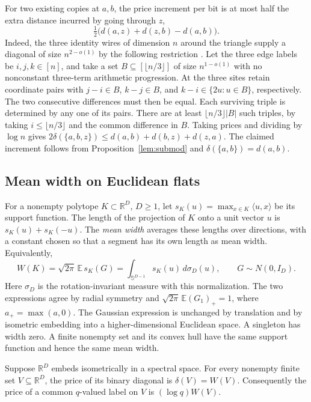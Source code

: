 For two existing copies at $a,b$, the price increment per bit is at
most half the extra distance incurred by going through $z$,
\[
 \tfrac12\bigl(d(a,z)+d(z,b)-d(a,b)\bigr).
\]
Indeed, the three identity wires of dimension $n$ around the triangle
supply a diagonal of size $n^{2-o(1)}$ by the following restriction
\cite{Strassen87,Behrend,cvzgraph}. Let the three edge labels be
$i,j,k\in[n]$, and take a set $B\subseteq[\lfloor n/3\rfloor]$ of
size $n^{1-o(1)}$ with no nonconstant three-term arithmetic progression.
At the three sites retain coordinate pairs with
$j-i\in B$, $k-j\in B$, and $k-i\in \{2u:u\in B\}$, respectively.
The two consecutive differences must then be equal.
Each surviving triple is determined by any one of its pairs. There are
at least $\lfloor n/3\rfloor |B|$ such triples, by taking
$i\le\lfloor n/3\rfloor$ and the common difference in $B$. Taking
prices and dividing by $\log n$ gives
$2\delta(\{a,b,z\})\le d(a,b)+d(b,z)+d(z,a)$. The claimed increment
follows from Proposition~\ref{lem:submod} and $\delta(\{a,b\})=d(a,b)$.

\subsection{Mean width on Euclidean flats}

For a nonempty polytope $K\subset\mathbb R^D$, $D\ge1$, let
$s_K(u)=\max_{x\in K}\langle u,x\rangle$ be its support function.
The length of the projection of $K$ onto a unit vector $u$ is
$s_K(u)+s_K(-u)$. The \emph{mean width} averages these lengths over
directions, with a constant chosen so that a segment has its own length
as mean width. Equivalently,
\[
 W(K)=\sqrt{2\pi}\,\mathbb E\,s_K(G)
     =\int_{\mathbb S^{D-1}}s_K(u)\,d\sigma_D(u),
 \qquad G\sim N(0,I_D).
\]
Here $\sigma_D$ is the rotation-invariant measure with this
normalization. The two expressions agree by radial symmetry and
$\sqrt{2\pi}\,\mathbb E(G_1)_+=1$, where
$a_+=\max(a,0)$. The Gaussian expression is unchanged by translation
and by isometric embedding into a higher-dimensional Euclidean space.
A singleton has width zero. A finite nonempty set and its convex hull
have the same support function and hence the same mean width.

\begin{theorem}\label{thm:flatlaw}
Suppose $\mathbb R^D$ embeds isometrically in a spectral space. For
every nonempty finite set $V\subseteq\mathbb R^D$, the price of its
binary diagonal is $\delta(V)=W(V)$. Consequently the price of a
common $q$-valued label on $V$ is $(\log q)W(V)$.
\end{theorem}

